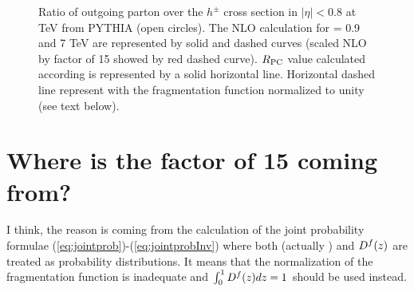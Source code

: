 \documentclass[12pt]{article}
\begin{document}
\begin{figure}[htbp]
   \centering
   \caption{Ratio of outgoing parton over the $h^{\pm}$ cross section in $|\eta|<0.8$ at  TeV from PYTHIA (open circles). The NLO calculation for \s= 0.9 and 7 TeV are represented by solid and dashed curves (scaled NLO by factor of 15 showed by red dashed curve). 
$R_{\rm PC}$ value calculated according  is represented by a solid horizontal line. Horizontal dashed line represent  
with the fragmentation function normalized to unity (see text below).
}  
   \label{fig:jetcrosssection}
\end{figure}

\section{Where is the factor of 15 coming from?}

I think, the reason is coming from the calculation of the joint probability formulae (\ref{eq:jointprob})-(\ref{eq:jointprobInv}) where both \fq{} (actually \ptq{}\fq) and $D^f(z)$ are treated as probability distributions. It means that the normalization of the fragmentation function 
 is inadequate and $\int_0^1D^f(z)dz=1$ should be used instead.
\end{document}
